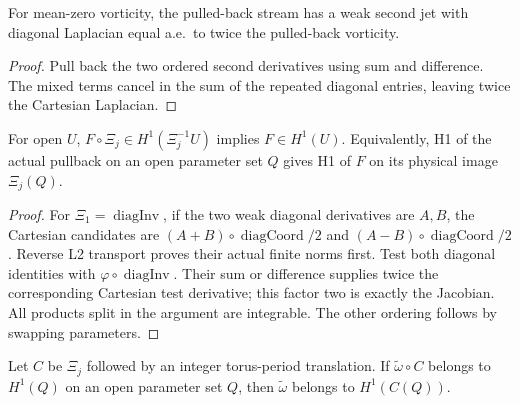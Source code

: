 \begin{lemma}
\label{lem:diagonal-stream-poisson}
\leanok
For mean-zero vorticity, the pulled-back stream has a weak second jet
with diagonal Laplacian equal a.e.\ to twice the pulled-back vorticity.
\end{lemma}

\begin{proof}
\leanok
Pull back the two ordered second derivatives using sum and difference.
The mixed terms cancel in the sum of the repeated diagonal entries, leaving
twice the Cartesian Laplacian.
\end{proof}

\begin{lemma}
\label{lem:diagonal-h1-inverse}
\leanok
For open $U$, $F\circ\Xi_j\in H^1(\Xi_j^{-1}U)$ implies $F\in H^1(U)$.
Equivalently, H1 of the actual pullback on an open parameter set $Q$
gives H1 of $F$ on its physical image $\Xi_j(Q)$.
\end{lemma}

\begin{proof}
\leanok
For $\Xi_1=\operatorname{diagInv}$, if the two weak diagonal derivatives
are $A,B$, the Cartesian candidates are
$(A+B)\circ\operatorname{diagCoord}/2$ and
$(A-B)\circ\operatorname{diagCoord}/2$.
Reverse L2 transport proves their actual finite norms first.
Test both diagonal identities with $\varphi\circ\operatorname{diagInv}$.
Their sum or difference supplies twice the corresponding Cartesian
test derivative; this factor two is exactly the Jacobian.
All products split in the argument are integrable.
The other ordering follows by swapping parameters.
\end{proof}

\begin{lemma}
\label{lem:translated-diagonal-h1}
\leanok
Let $C$ be $\Xi_j$ followed by an integer torus-period translation.
If $\widetilde\omega\circ C$ belongs to $H^1(Q)$ on an open parameter
set $Q$, then $\widetilde\omega$ belongs to $H^1(C(Q))$.
\end{lemma}


